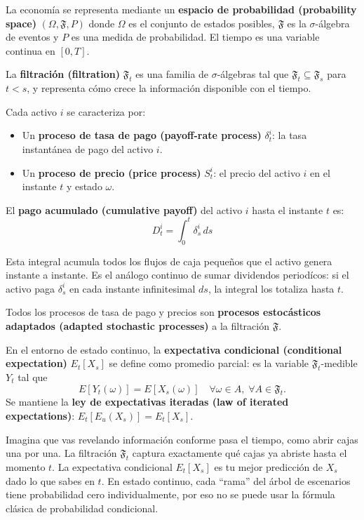 \documentclass[12pt]{article}
\begin{document}
La econom\'ia se representa mediante un \textbf{espacio de probabilidad (probability space)} $(\Omega, \mathfrak{F}, P)$ donde $\Omega$ es el conjunto de estados posibles, $\mathfrak{F}$ es la $\sigma$-\'algebra de eventos y $P$ es una medida de probabilidad. El tiempo es una variable continua en $[0,T]$.

La \textbf{filtraci\'on (filtration)} $\mathfrak{F}_t$ es una familia de $\sigma$-\'algebras tal que $\mathfrak{F}_t \subseteq \mathfrak{F}_s$ para $t < s$, y representa c\'omo crece la informaci\'on disponible con el tiempo.

Cada activo $i$ se caracteriza por:
\begin{itemize}
  \item Un \textbf{proceso de tasa de pago (payoff-rate process)} $\delta_t^i$: la tasa instant\'anea de pago del activo $i$.
  \item Un \textbf{proceso de precio (price process)} $S_t^i$: el precio del activo $i$ en el instante $t$ y estado $\omega$.
\end{itemize}

El \textbf{pago acumulado (cumulative payoff)} del activo $i$ hasta el instante $t$ es:
\begin{equation}
  D_t^i = \int_0^t \delta_s^i \, ds
\end{equation}

\begin{intuicionmat}
Esta integral acumula todos los flujos de caja peque\~nos que el activo genera instante a instante. Es el an\'alogo continuo de sumar dividendos period\'icos: si el activo paga $\delta_s^i$ en cada instante infinitesimal $ds$, la integral los totaliza hasta $t$.
\end{intuicionmat}

Todos los procesos de tasa de pago y precios son \textbf{procesos estoc\'asticos adaptados (adapted stochastic processes)} a la filtraci\'on $\mathfrak{F}$.

En el entorno de estado continuo, la \textbf{expectativa condicional (conditional expectation)} $E_t[X_s]$ se define como promedio parcial: es la variable $\mathfrak{F}_t$-medible $Y_t$ tal que
\[
  E[Y_t(\omega)] = E[X_s(\omega)] \quad \forall \omega \in A,\; \forall A \in \mathfrak{F}_t.
\]
Se mantiene la \textbf{ley de expectativas iteradas (law of iterated expectations)}: $E_t[E_u(X_s)] = E_t[X_s]$.

\begin{intuicion}
Imagina que vas revelando informaci\'on conforme pasa el tiempo, como abrir cajas una por una. La filtraci\'on $\mathfrak{F}_t$ captura exactamente qu\'e cajas ya abriste hasta el momento $t$. La expectativa condicional $E_t[X_s]$ es tu mejor predicci\'on de $X_s$ dado lo que sabes en $t$. En estado continuo, cada ``rama'' del \'arbol de escenarios tiene probabilidad cero individualmente, por eso no se puede usar la f\'ormula cl\'asica de probabilidad condicional.
\end{intuicion}
\end{document}
